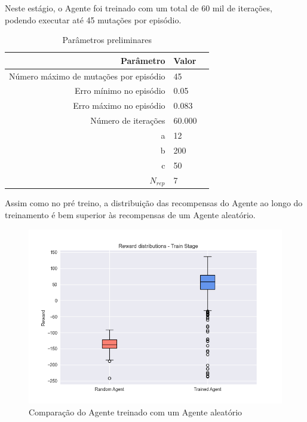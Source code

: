 Neste estágio, o Agente foi treinado com um total de 60 mil de iterações, podendo executar até 45 mutações por episódio. 

\begin{table}[H]
  \centering
  \vspace{0.5cm}
  \begin{tabular}{r|lr}
  Parâmetro & Valor \\ 
  \hline                               %
  Número máximo de mutações por episódio & 45 \\
  Erro mínimo no episódio & 0.05 \\
  Erro máximo no episódio & 0.083 \\
  Número de iterações & 60.000 \\
  a & 12 \\
  b & 200 \\
  c & 50 \\
  $N_{rep}$ & 7 \\
  \end{tabular}
  \caption{Parâmetros preliminares}
  \end{table}

  Assim como no pré treino, a distribuição das recompensas do Agente ao longo do treinamento é 
  bem superior às recompensas de um Agente aleatório.  
  \begin{figure}[H]
    \centering
    \includegraphics[width=.9\linewidth]{figuras/plot_box_train_reward.jpg}  
    \caption{Comparação do Agente treinado com um Agente aleatório}
    \label{fig:box-train}
  \end{figure}

